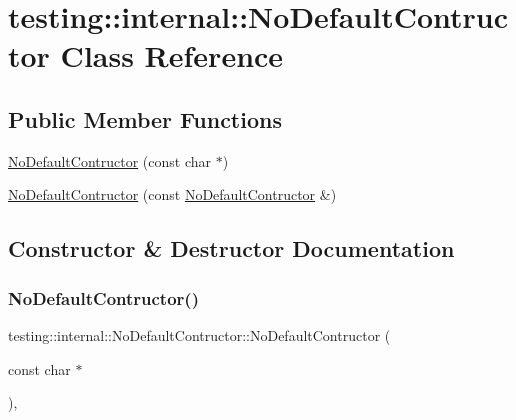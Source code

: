 \hypertarget{classtesting_1_1internal_1_1_no_default_contructor}{}\section{testing\+:\+:internal\+:\+:No\+Default\+Contructor Class Reference}
\label{classtesting_1_1internal_1_1_no_default_contructor}
\subsection*{Public Member Functions}
\begin{DoxyCompactItemize}
\item 
\hyperlink{classtesting_1_1internal_1_1_no_default_contructor_a34c9cdf833476a9718141dcff931ba42}{No\+Default\+Contructor} (const char $\ast$)
\item 
\hyperlink{classtesting_1_1internal_1_1_no_default_contructor_acba74b55a8c5341808ecb5b9318eaecf}{No\+Default\+Contructor} (const \hyperlink{classtesting_1_1internal_1_1_no_default_contructor}{No\+Default\+Contructor} \&)
\end{DoxyCompactItemize}


\subsection{Constructor \& Destructor Documentation}
\mbox{\label{classtesting_1_1internal_1_1_no_default_contructor_a34c9cdf833476a9718141dcff931ba42}} 
\subsubsection{\texorpdfstring{No\+Default\+Contructor()}{NoDefaultContructor()}\hspace{0.1cm}{\footnotesize\ttfamily [1/2]}}
{\footnotesize\ttfamily testing\+::internal\+::\+No\+Default\+Contructor\+::\+No\+Default\+Contructor (\begin{DoxyParamCaption}\item[{const char $\ast$}]{ }\end{DoxyParamCaption})\hspace{0.3cm}{\ttfamily [inline]}, {\ttfamily [explicit]}}

